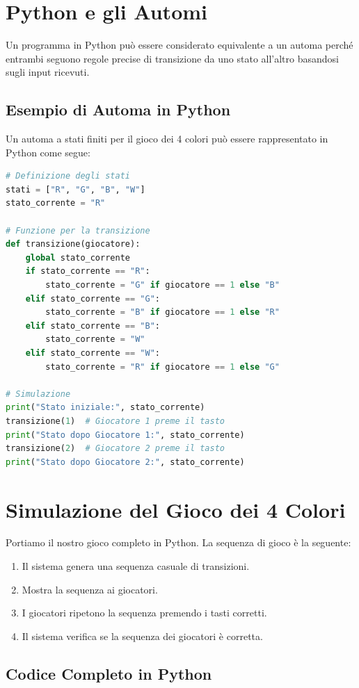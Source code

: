 \documentclass[a4paper,12pt]{report}
\begin{document}
\section{Python e gli Automi}
Un programma in Python può essere considerato equivalente a un automa perché entrambi seguono regole precise di transizione da uno stato all'altro basandosi sugli input ricevuti.

\subsection{Esempio di Automa in Python}
Un automa a stati finiti per il gioco dei 4 colori può essere rappresentato in Python come segue:
\begin{lstlisting}[language=Python, caption={Esempio di automa a stati finiti in Python}]
# Definizione degli stati
stati = ["R", "G", "B", "W"]
stato_corrente = "R"

# Funzione per la transizione
def transizione(giocatore):
    global stato_corrente
    if stato_corrente == "R":
        stato_corrente = "G" if giocatore == 1 else "B"
    elif stato_corrente == "G":
        stato_corrente = "B" if giocatore == 1 else "R"
    elif stato_corrente == "B":
        stato_corrente = "W"
    elif stato_corrente == "W":
        stato_corrente = "R" if giocatore == 1 else "G"

# Simulazione
print("Stato iniziale:", stato_corrente)
transizione(1)  # Giocatore 1 preme il tasto
print("Stato dopo Giocatore 1:", stato_corrente)
transizione(2)  # Giocatore 2 preme il tasto
print("Stato dopo Giocatore 2:", stato_corrente)
\end{lstlisting}

\section{Simulazione del Gioco dei 4 Colori}
Portiamo il nostro gioco completo in Python. La sequenza di gioco è la seguente:
\begin{enumerate}
    \item Il sistema genera una sequenza casuale di transizioni.
    \item Mostra la sequenza ai giocatori.
    \item I giocatori ripetono la sequenza premendo i tasti corretti.
    \item Il sistema verifica se la sequenza dei giocatori è corretta.
\end{enumerate}

\subsection{Codice Completo in Python}

\end{document}
